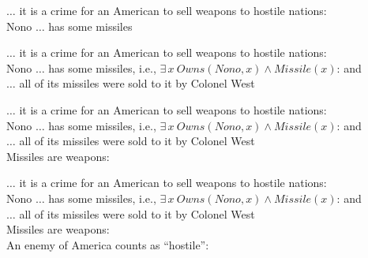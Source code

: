 \documentclass{article}
\begin{document}
\begin{huge}

$\ldots$ it is a crime for an American to sell weapons to hostile nations:\al
  \\
Nono $\ldots$ has some missiles


$\ldots$ it is a crime for an American to sell weapons to hostile nations:\al
  \\
Nono $\ldots$ has some missiles, i.e., $\exists\,x\ Owns(Nono,x)\land Missile(x)$:\al
   and \\
$\ldots$ all of its missiles were sold to it by Colonel West


$\ldots$ it is a crime for an American to sell weapons to hostile nations:\al
  \\
Nono $\ldots$ has some missiles, i.e., $\exists\,x\ Owns(Nono,x)\land Missile(x)$:\al
   and \\
$\ldots$ all of its missiles were sold to it by Colonel West\al
  \\
Missiles are weapons:


$\ldots$ it is a crime for an American to sell weapons to hostile nations:\al
  \\
Nono $\ldots$ has some missiles, i.e., $\exists\,x\ Owns(Nono,x)\land Missile(x)$:\al
   and \\
$\ldots$ all of its missiles were sold to it by Colonel West\al
  \\
Missiles are weapons:\al
  \\
An enemy of America counts as ``hostile'':


\end{huge}
\end{document}
